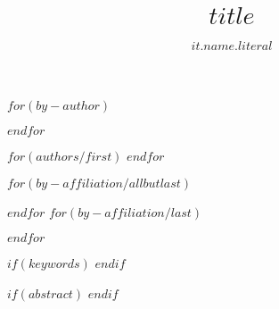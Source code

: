 \begin{Frontmatter}

\title[Article Title]{$title$}

$for(by-author)$
\author[$for(it.affiliations)$$it.number$$sep$,$endfor$]{$it.name.literal$}
$endfor$

$for(authors/first)$
$endfor$

$for(by-affiliation/allbutlast)$
\address[$it.number$]{$if(it.department)$, $endif$$if(it.name)$, $endif$}
$endfor$
$for(by-affiliation/last)$
\address[$it.number$]{$if(it.department)$, $endif$$if(it.name)$, $endif$$if(email)$ $endif$}
$endfor$

$if(keywords)$
$endif$


$if(abstract)$
$endif$

\end{Frontmatter}
